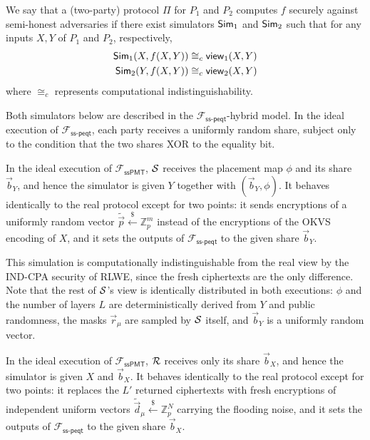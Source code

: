 \begin{definition}
We say that a (two-party) protocol $\Pi$ for $P_1$ and $P_2$ computes $f$ securely against semi-honest adversaries if there exist simulators ${\sf Sim}_1$ and ${\sf Sim}_2$ such that for any inputs $X, Y$ of $P_1$ and $P_2$, respectively, 
\begin{align*}
    {\sf Sim}_1(X, f(X, Y)) \cong_c {\sf view}_1(X, Y) \\
{\sf Sim}_2(Y, f(X, Y)) \cong_c {\sf view}_2(X, Y) 
\end{align*}
where $\cong_c$ represents computational indistinguishability.
\end{definition}

Both simulators below are described in the $\mathcal{F}_{\mathsf{ss\mbox{-}peqt}}$-hybrid model. In the ideal execution of $\mathcal{F}_{\mathsf{ss\mbox{-}peqt}}$, each party receives a uniformly random share, subject only to the condition that the two shares XOR to the equality bit.

In the ideal execution of $\mathcal{F}_{\mathsf{ssPMT}}$, $\mathcal{S}$ receives the placement map $\phi$ and its share $\vec b_Y$, and hence the simulator is given $Y$ together with $(\vec b_Y, \phi)$. It behaves identically to the real protocol except for two points: it sends encryptions of a uniformly random vector $\tilde{\vec p}\xleftarrow{\$}\mathbb Z_p^m$ instead of the encryptions of the OKVS encoding of $X$, and it sets the outputs of $\mathcal{F}_{\mathsf{ss\mbox{-}peqt}}$ to the given share $\vec b_Y$.

This simulation is computationally indistinguishable from the real view by the IND-CPA security of RLWE, since the fresh ciphertexts are the only difference. Note that the rest of $\mathcal{S}$'s view is identically distributed in both executions: $\phi$ and the number of layers $L$ are deterministically derived from $Y$ and public randomness, the masks $\vec r_\mu$ are sampled by $\mathcal{S}$ itself, and $\vec b_Y$ is a uniformly random vector.

In the ideal execution of $\mathcal{F}_{\mathsf{ssPMT}}$, $\mathcal{R}$ receives only its share $\vec b_X$, and hence the simulator is given $X$ and $\vec b_X$. It behaves identically to the real protocol except for two points: it replaces the $L'$ returned ciphertexts with fresh encryptions of independent uniform vectors $\tilde{\vec d}_\mu\xleftarrow{\$}\mathbb Z_p^N$ carrying the flooding noise, and it sets the outputs of $\mathcal{F}_{\mathsf{ss\mbox{-}peqt}}$ to the given share $\vec b_X$.

